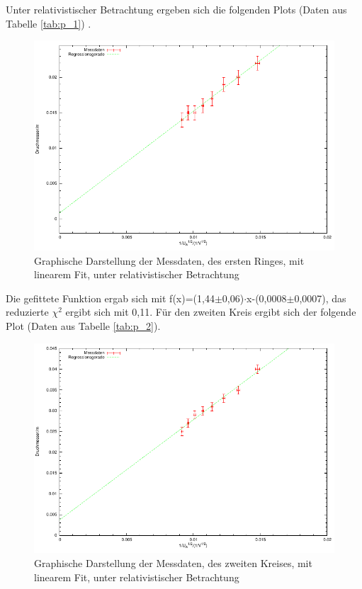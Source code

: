 \documentclass[12pt,a4paper]{article}
\begin{document}
\newpage
Unter relativistischer Betrachtung ergeben sich die folgenden Plots (Daten aus Tabelle \ref{tab:p_1}) .
\begin{figure}[H] 
  \centering
    \includegraphics[scale = 1]{kreis_1_r.pdf}
  	\caption[Graphische Darstellung der Messdaten, des ersten Ringes, mit linearem Fit, unter relativistischer Betrachtung]{Graphische Darstellung der Messdaten, des ersten Ringes, mit linearem Fit, unter relativistischer Betrachtung}
  \label{fig:plot_1}
\end{figure}

Die gefittete Funktion ergab sich mit f(x)=(1,44$\pm$0,06)$\cdot$x-(0,0008$\pm$0,0007), das reduzierte $\chi^2$ ergibt sich mit 0,11.
\newpage
Für den zweiten Kreis ergibt sich der folgende Plot (Daten aus Tabelle \ref{tab:p_2}).

\begin{figure}[H] 
  \centering
    \includegraphics[scale = 1]{kreis_2_r.pdf}
  	\caption[Graphische Darstellung der Messdaten, des zweiten Kreises, mit linearem Fit, unter relativistischer Betrachtung]{Graphische Darstellung der Messdaten, des zweiten Kreises, mit linearem Fit, unter relativistischer Betrachtung}
  \label{fig:plot_1}
\end{figure}
\end{document}
